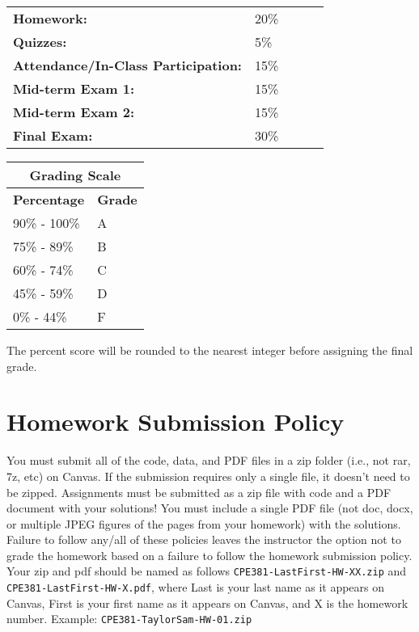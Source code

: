 \documentclass[12pt,nohyper,nobib,xcolor=dvipsnames,svgnames,x11names]{tufte-book}
\begin{document}
\begin{center} 
\begin{tabular}{lp{1in} l l l}
\textbf{Homework:} & 20\% \\
 \textbf{Quizzes:} &  5\%\\
\textbf{Attendance/In-Class Participation:} & 15\%\\
\textbf{Mid-term Exam 1:} & 15\%  \\
\textbf{Mid-term Exam 2:} & 15\%  \\
\textbf{Final Exam:} & 30\%  \\
\end{tabular}
\end{center}


\begin{tabular}{|p{3cm}|p{3cm}|}
\hline
\multicolumn{2}{|c|}{\textbf{Grading Scale}} \\ \hline
\textbf{Percentage} & \textbf{Grade} \\ \hline
90\% - 100\% & A \\ \hline
75\% - 89\% & B \\ \hline
60\% - 74\% & C \\ \hline
45\% - 59\% & D \\ \hline
0\% - 44\% & F \\ \hline
\end{tabular}

The percent score will be rounded to the nearest integer before assigning the final grade.



\section*{Homework Submission Policy}
You must submit all of the code, data, and PDF files in a zip folder (i.e., not rar, 7z, etc) on Canvas. If the submission requires only a single file, it doesn't need to be zipped. Assignments must be submitted as a zip file with code and a PDF document with your solutions!  You must include a single PDF file (not doc, docx, or multiple JPEG figures of the pages from your homework) with the solutions. Failure to follow any/all of these policies leaves the instructor the option not to grade the homework based on a failure to follow the homework submission policy. Your zip and pdf should be named as follows \texttt{CPE381-LastFirst-HW-XX.zip} and \texttt{CPE381-LastFirst-HW-X.pdf}, where Last is your last name as it appears on Canvas, First is your first name as it appears on Canvas, and X is the homework number. Example: \texttt{CPE381-TaylorSam-HW-01.zip}
\end{document}
